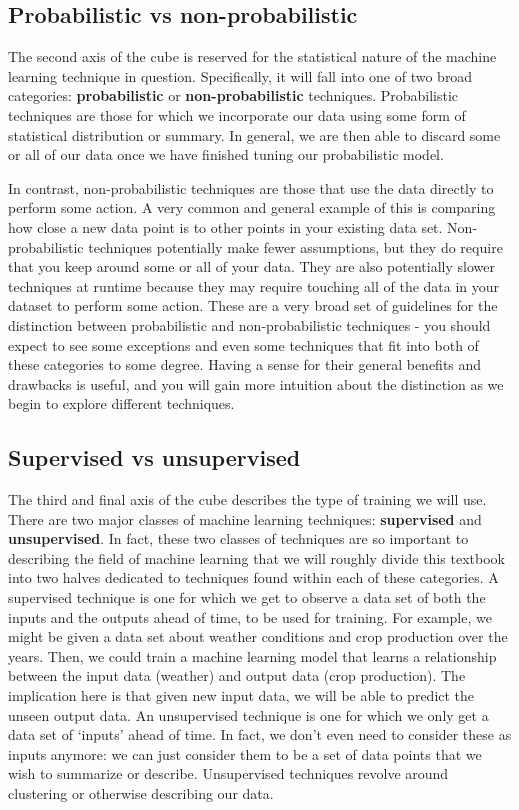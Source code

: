 \subsection{Probabilistic vs non-probabilistic}
The second axis of the cube is reserved for the statistical nature of the machine learning technique in question. Specifically, it will fall into one of two broad categories: \textbf{probabilistic} or \textbf{non-probabilistic} techniques. Probabilistic techniques are those for which we incorporate our data using some form of statistical distribution or summary. In general, we are then able to discard some or all of our data once we have finished tuning our probabilistic model.

In contrast, non-probabilistic techniques are those that use the data directly to perform some action. A very common and general example of this is comparing how close a new data point is to other points in your existing data set. Non-probabilistic techniques potentially make fewer assumptions, but they do require that you keep around some or all of your data. They are also potentially slower techniques at runtime because they may require touching all of the data in your dataset to perform some action. These are a very broad set of guidelines for the distinction between probabilistic and non-probabilistic techniques - you should expect to see some exceptions and even some techniques that fit into both of these categories to some degree. Having a sense for their general benefits and drawbacks is useful, and you will gain more intuition about the distinction as we begin to explore different techniques.

\subsection{Supervised vs unsupervised}
The third and final axis of the cube describes the type of training we will use. There are two major classes of machine learning techniques: \textbf{supervised} and \textbf{unsupervised}. In fact, these two classes of techniques are so important to describing the field of machine learning that we will roughly divide this textbook into two halves dedicated to techniques found within each of these categories. A supervised technique is one for which we get to observe a data set of both the inputs and the outputs ahead of time, to be used for training. For example, we might be given a data set about weather conditions and crop production over the years. Then, we could train a machine learning model that learns a relationship between the input data (weather) and output data (crop production). The implication here is that given new input data, we will be able to predict the unseen output data. An unsupervised technique is one for which we only get a data set of `inputs' ahead of time. In fact, we don't even need to consider these as inputs anymore: we can just consider them to be a set of data points that we wish to summarize or describe. Unsupervised techniques revolve around clustering or otherwise describing our data.

